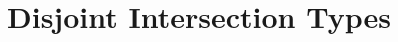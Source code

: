 \documentclass[nocopyrightspace,preprint,times,9pt]{sigplanconf}
\begin{document}
\begin{comment}
We can try to rule out such possibilities by making the requirement of
well-formedness stronger. This suggests that the two types on the sides of
$\inter$ should not ``overlap''. In other words, they should be ``disjoint''. It
is easy to determine if two base types are disjoint. For example, $\code{Int}$
and $\code{Int}$ are not disjoint. Neither do $\code{Int}$ and $\code{Nat}$.
Also, types built with different constructors are disjoint. For example,
$\code{Int}$ and $\code{Int} \to \code{Int}$. For function types, disjointness
is harder to visualise. But bear in the mind that disjointness can defined by
the very requirement that the theorem holds.

We shall give two semantics and show the two are the same.

\begin{itemize}
\item an type-directed semantics
\item a direct operational semantics
\end{itemize}

say the example above:

without the cast, you could either get:
1,,'c'
or
1
depending on what rules you use

but I think with your change, you can only get the first

(which is what we want)

let me see how we can get `1` before the change

\begin{mathpar}

\end{mathpar}


With the change, we need $\code{Int} \subtype \code{Int} \inter \code{Char}$ to
hold in order to get the premise, which does not. So it can be shown that
$(\code{Int} \inter \code{Char}) ((1 \mergeOp 'c') : \code{Int} \inter
\code{Char}) \hookrightarrow 1$ is not derivable.
\end{comment}








\section{Disjoint Intersection Types}
\end{document}
